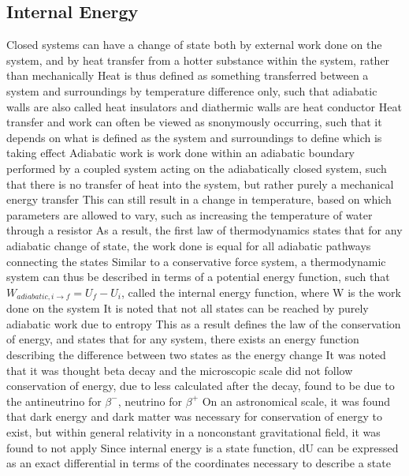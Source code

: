 \subsection{Internal Energy}
\begin{outline*}
\1 Closed systems can have a change of state both by external work done on the system, and by heat transfer from a hotter substance within the system, rather than mechanically
\2 Heat is thus defined as something transferred between a system and surroundings by temperature difference only, such that adiabatic walls are also called heat insulators and diathermic walls are heat conductor
\2 Heat transfer and work can often be viewed as snonymously occurring, such that it depends on what is defined as the system and surroundings to define which is taking effect
\1 Adiabatic work is work done within an adiabatic boundary performed by a coupled system acting on the adiabatically closed system, such that there is no transfer of heat into the system, but rather purely a mechanical energy transfer
\2 This can still result in a change in temperature, based on which parameters are allowed to vary, such as increasing the temperature of water through a resistor
\2 As a result, the first law of thermodynamics states that for any adiabatic change of state, the work done is equal for all adiabatic pathways connecting the states
\3 Similar to a conservative force system, a thermodynamic system can thus be described in terms of a potential energy function, such that $W_{adiabatic, i \to f} = U_f - U_i$, called the internal energy function, where W is the work done on the system
\3 It is noted that not all states can be reached by purely adiabatic work due to entropy
\3 This as a result defines the law of the conservation of energy, and states that for any system, there exists an energy function describing the difference between two states as the energy change
\4 It was noted that it was thought beta decay and the microscopic scale did not follow conservation of energy, due to less calculated after the decay, found to be due to the antineutrino for $\beta^-$, neutrino for $\beta^+$
\4 On an astronomical scale, it was found that dark energy and dark matter was necessary for conservation of energy to exist, but within general relativity in a nonconstant gravitational field, it was found to not apply
\2 Since internal energy is a state function, dU can be expressed as an exact differential in terms of the coordinates necessary to describe a state
\end{outline*}
